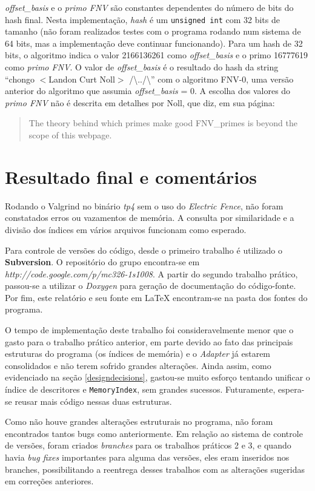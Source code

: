 \documentclass[a4paper,10pt]{article}
\begin{document}
\textit{offset\_basis} e o \textit{primo FNV} são constantes dependentes do número de bits do hash final. Nesta implementação, \textit{hash} é um \texttt{unsigned int} com 32 bits de tamanho (não foram realizados testes com o programa rodando num sistema de 64 bits, mas a implementação deve continuar funcionando). Para um hash de 32 bits, o algoritmo indica o valor 2166136261 como \textit{offset\_basis} e o primo 16777619 como \textit{primo FNV}. O valor de \textit{offset\_basis} é o resultado do hash da string ``chongo $<$Landon Curt Noll$>$ /\textbackslash../\textbackslash'' com o algoritmo FNV-0, uma versão anterior do algoritmo que assumia \textit{offset\_basis} = 0. A escolha dos valores do \textit{primo FNV} não é descrita em detalhes por Noll, que diz, em sua página:

\begin{quote}
The theory behind which primes make good FNV\_primes is beyond the scope of this webpage.
\end{quote}

\section{Resultado final e comentários}
Rodando o Valgrind no binário \textit{tp4} sem o uso do \textit{Electric Fence}, não foram constatados erros ou vazamentos de memória. A consulta por similaridade e a divisão dos índices em vários arquivos funcionam como esperado.

Para controle de versões do código, desde o primeiro trabalho é utilizado o \textbf{Subversion}. O repositório do grupo encontra-se em \textit{http://code.google.com/p/mc326-1s1008}. A partir do segundo trabalho prático, passou-se a utilizar o \textit{Doxygen} para geração de documentação do código-fonte. Por fim, este relatório e seu fonte em LaTeX encontram-se na pasta dos fontes do programa.

O tempo de implementação deste trabalho foi consideravelmente menor que o gasto para o trabalho prático anterior, em parte devido ao fato das principais estruturas do programa (os índices de memória) e o \textit{Adapter} já estarem consolidados e não terem sofrido grandes alterações. Ainda assim, como evidenciado na seção \ref{designdecisions}, gastou-se muito esforço tentando unificar o índice de descritores e \texttt{MemoryIndex}, sem grandes sucessos. Futuramente, espera-se reusar mais código nessas duas estruturas.

Como não houve grandes alterações estruturais no programa, não foram encontrados tantos bugs como anteriormente. Em relação ao sistema de controle de versões, foram criados \textit{branches} para os trabalhos práticos 2 e 3, e quando havia \textit{bug fixes} importantes para alguma das versões, eles eram inseridos nos branches, possibilitando a reentrega desses trabalhos com as alterações sugeridas em correções anteriores.
\end{document}
